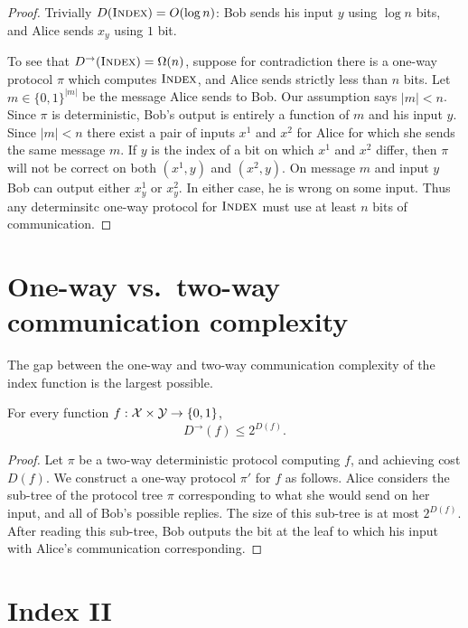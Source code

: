 \begin{proof}
Trivially $D(\textsc{Index}) = O(\log n)$: Bob sends his input $y$ using $\log n$ bits, and Alice sends $x_y$ using $1$ bit.

To see that $D^\rightarrow(\textsc{Index}) = \Omega(n)$, suppose for contradiction there is a one-way protocol $\pi$ which computes $\textsc{Index}$, and Alice sends strictly less than $n$ bits. Let $m\in\{0,1\}^{|m|}$ be the message Alice sends to Bob. Our assumption says $|m| < n$. Since $\pi$ is deterministic, Bob's output is entirely a function of $m$ and his input $y$. Since $|m|<n$ there exist a pair of inputs $x^1$ and $x^2$ for Alice for which she sends the same message $m$. If $y$ is the index of a bit on which $x^1$ and $x^2$ differ, then $\pi$ will not be correct on both $(x^1,y)$ and $(x^2,y)$. On message $m$ and input $y$ Bob can output either $x^1_y$ or $x^2_y$. In either case, he is wrong on some input. Thus any determinsitc one-way protocol for $\textsc{Index}$ must use at least $n$ bits of communication.
\end{proof}



\newpage 
\section{One-way vs.~two-way communication complexity}

The gap between the one-way and two-way communication complexity of the index function is the largest possible.

\begin{theorem}
For every function $f : \mathcal{X} \times \mathcal{Y} \to \{0,1\}$,
\[
D^\rightarrow(f) \le 2^{D(f)}.
\]
\end{theorem}

\begin{proof}
Let $\pi$ be a two-way deterministic protocol computing $f$, and achieving cost $D(f)$. We construct a one-way protocol $\pi'$ for $f$ as follows. Alice considers the sub-tree of the protocol tree $\pi$ corresponding to what she would send on her input, and all of Bob's possible replies. The size of this sub-tree is at most $2^{D(f)}$. After reading this sub-tree, Bob outputs the bit at the leaf to which his input with Alice's communication corresponding.
\end{proof}



\newpage 
\section{Index II}

